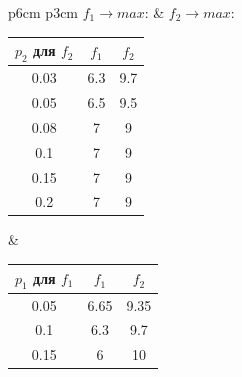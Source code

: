 \documentclass[14pt,fleqn]{extarticle}
\begin{document}
	\begin{center}
		\begin{tabular}{p{6cm} p{3cm}}
			$f_1 \longrightarrow max$: & $f_2 \longrightarrow max$:\\
			\begin{tabular}{ |c|c|c| }
				\hline
				$p_2$ для $f_2$ & $f_1$ & $f_2$\\
				\hline
				0.03 & 6.3 & 9.7\\
				\hline
				0.05 & 6.5 & 9.5\\
				\hline
				0.08 & 7 & 9\\
				\hline
				0.1 & 7 & 9\\
				\hline
				0.15 & 7 & 9 \\
				\hline
				0.2 & 7 & 9\\
				\hline
			\end{tabular} &
			\begin{tabular}{ |c|c|c| }
				\hline
				$p_1$ для $f_1$ & $f_1$ & $f_2$\\
				\hline
				0.05 & 6.65 & 9.35 \\
				\hline
				0.1 & 6.3 & 9.7 \\
				\hline
				0.15 & 6 & 10 \\
				\hline
			\end{tabular} \\
		\end{tabular}
	\end{center}
\end{document}
